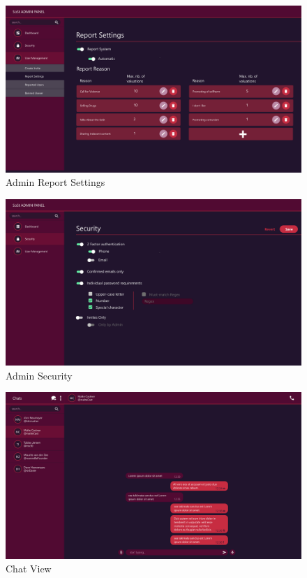 \begin{figure}[h]
    \centering
    \includegraphics[width=1.0\textwidth]{./graphics/wireframes/AdminReportSettings}
    \caption{Admin Report Settings}
    \label{fig:figure12}
\end{figure}

\begin{figure}[h]
    \centering
    \includegraphics[width=1.0\textwidth]{./graphics/wireframes/AdminSecurity}
    \caption{Admin Security}
    \label{fig:figure13}
\end{figure}

\begin{figure}[h]
    \centering
    \includegraphics[width=1.0\textwidth]{./graphics/wireframes/ChatView}
    \caption{Chat View}
    \label{fig:figure14}
\end{figure}

